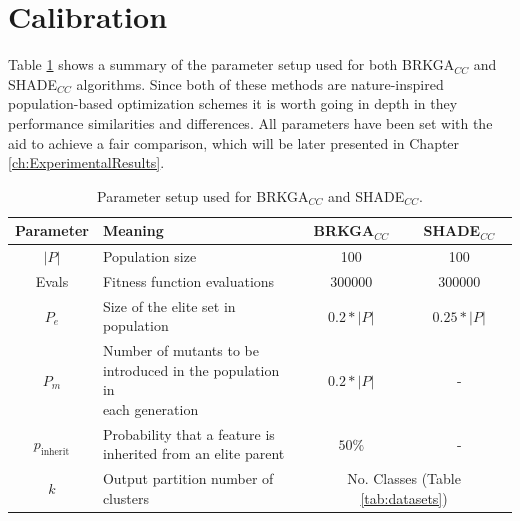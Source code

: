 \section{Calibration} \label{sec:Calibration}

Table \ref{tab:paramsSHADE} shows a summary of the parameter setup used for both \acs{BRKGA}$_{CC}$ and \acs{SHADE}$_{CC}$ algorithms. Since both of these methods are nature-inspired population-based optimization schemes it is worth going in depth in they performance similarities and differences. All parameters have been set with the aid to achieve a fair comparison, which will be later presented in Chapter \ref{ch:ExperimentalResults}.

\begin{table}[!h]
	\centering
	\setlength{\tabcolsep}{7pt}
	\renewcommand{\arraystretch}{1.4}
		\begin{tabular}{c l cc}
			\hline
			Parameter & Meaning & \acs{BRKGA}$_{CC}$ & \acs{SHADE}$_{CC}$ \\
			\hline
			$|P|$ & Population size & 100 & 100 \\
			Evals & Fitness function evaluations & 300000 & 300000 \\
			$P_e$ & \makecell[l]{Size of the elite set in \\ population} & $0.2 * |P|$ & $0.25 * |P|$ \\
			$P_m$ & \makecell[l]{Number of mutants to be \\ introduced in the population in \\ each generation} & $0.2 * |P|$ & - \\
			$p_\text{inherit}$ & \makecell[l]{Probability that a feature is \\ inherited  from an elite parent} & $50\%$ & - \\
			$k$ & \makecell[l]{Output partition number of \\ clusters} & \multicolumn{2}{m{4cm}}{No. Classes (Table \ref{tab:datasets})} \\
			\hline
			
	\end{tabular}%
	
	\caption{Parameter setup used for \acs{BRKGA}$_{CC}$ and \acs{SHADE}$_{CC}$.}
	\label{tab:paramsSHADE}
\end{table}

\newpage

